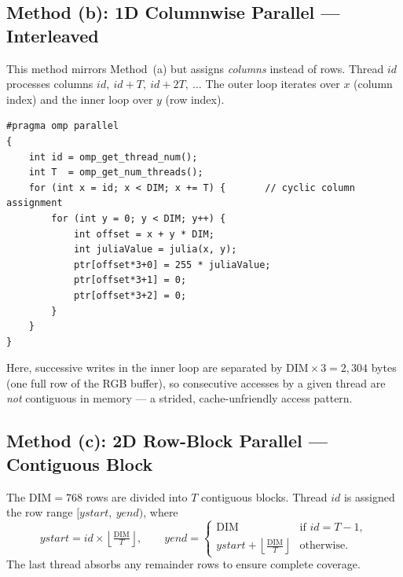 \subsection{Method (b): 1D Columnwise Parallel — Interleaved}

This method mirrors Method~(a) but assigns \emph{columns} instead of rows.
Thread $\mathit{id}$ processes columns $\mathit{id},\ \mathit{id}+T,\
\mathit{id}+2T,\ \ldots$
The outer loop iterates over $x$ (column index) and the inner loop over $y$ (row
index).

\begin{lstlisting}[caption={1D Columnwise interleaved kernel (key excerpt)},label={lst:colwise}]
#pragma omp parallel
{
    int id = omp_get_thread_num();
    int T  = omp_get_num_threads();
    for (int x = id; x < DIM; x += T) {       // cyclic column assignment
        for (int y = 0; y < DIM; y++) {
            int offset = x + y * DIM;
            int juliaValue = julia(x, y);
            ptr[offset*3+0] = 255 * juliaValue;
            ptr[offset*3+1] = 0;
            ptr[offset*3+2] = 0;
        }
    }
}
\end{lstlisting}

Here, successive writes in the inner loop are separated by
$\text{DIM} \times 3 = 2{,}304$ bytes (one full row of the RGB buffer), so consecutive
accesses by a given thread are \emph{not} contiguous in memory — a strided, cache-unfriendly access pattern.

\subsection{Method (c): 2D Row-Block Parallel — Contiguous Block}

The $\text{DIM} = 768$ rows are divided into $T$ contiguous blocks.
Thread $\mathit{id}$ is assigned the row range $[\mathit{ystart},\ \mathit{yend})$,
where
\[
  \mathit{ystart} = \mathit{id} \times \left\lfloor \tfrac{\text{DIM}}{T} \right\rfloor,
  \qquad
  \mathit{yend}   = \begin{cases}
    \text{DIM} & \text{if } \mathit{id} = T-1,\\
    \mathit{ystart} + \left\lfloor \tfrac{\text{DIM}}{T} \right\rfloor & \text{otherwise.}
  \end{cases}
\]
The last thread absorbs any remainder rows to ensure complete coverage.

